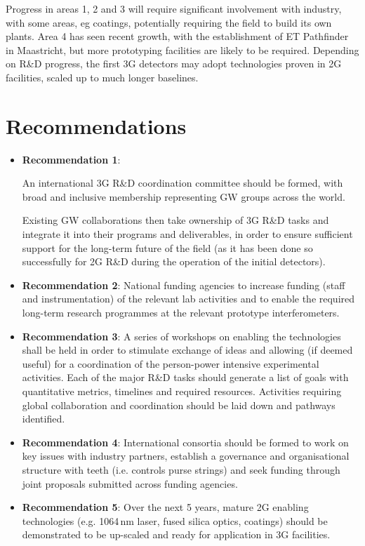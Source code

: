 \noindent Progress in areas 1, 2 and 3 will require significant involvement with industry, with some areas, eg coatings,  potentially requiring the field to build its own plants. Area 4 has seen recent growth, with the establishment of ET Pathfinder in Maastricht, but more prototyping facilities are likely to be required. Depending on R\&D progress, the first 3G detectors may adopt technologies proven in 2G facilities, scaled up to much longer baselines. 

\section*{Recommendations}
 
\begin{itemize}
\item \textbf{Recommendation 1}:  

 An international 3G R\&D coordination committee should be formed, with broad and inclusive membership representing GW groups across the world.

Existing GW collaborations then take ownership of 3G R\&D tasks and integrate it into their programs and deliverables, in order to ensure sufficient support for the long-term future of the field (as it has been done so successfully for 2G R\&D during the operation of the initial detectors).
\item \textbf{Recommendation 2}: National funding agencies to increase funding (staff and instrumentation) of the relevant lab activities and to enable the required long-term research programmes at the relevant prototype interferometers.


\item \textbf{Recommendation 3}: A series of workshops on enabling the technologies shall be held in order to stimulate exchange of ideas and allowing (if deemed useful) for a coordination of the person-power intensive experimental activities.  Each of the major R\&D tasks should generate a list of  goals with quantitative metrics,  timelines and required resources.   Activities requiring global collaboration and coordination should be laid down and pathways identified.

\item \textbf{Recommendation 4}:  International consortia should be formed to work on key issues with industry partners, establish a governance and organisational structure with teeth (i.e. controls purse strings) and seek funding through joint proposals submitted across funding agencies.
\item \textbf{Recommendation 5}: Over the next 5 years, mature 2G enabling technologies (e.g. 1064\,nm laser, fused silica optics, coatings) should be demonstrated to be up-scaled and ready for application in 3G facilities.

\end{itemize}

